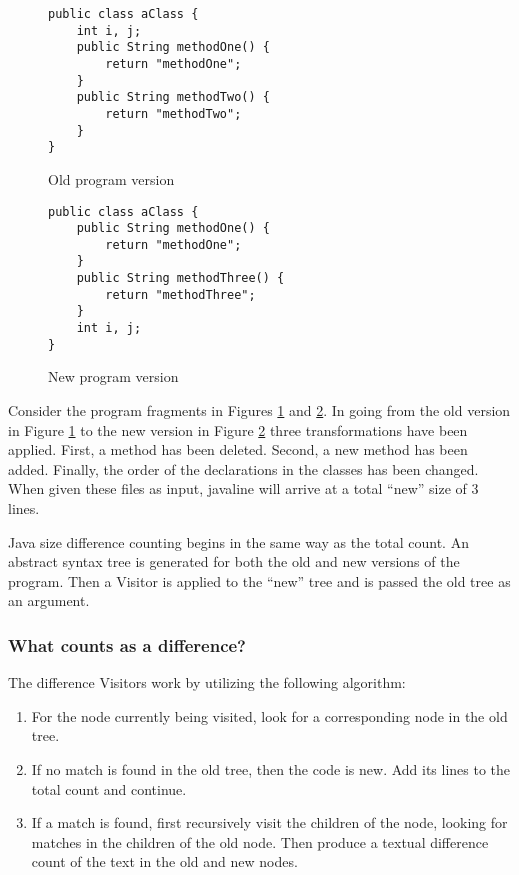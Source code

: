 \singlespace
\begin{figure}
  \centering 
  \begin{verbatim}
public class aClass {
    int i, j;
    public String methodOne() {
        return "methodOne";
    }
    public String methodTwo() {
        return "methodTwo";
    }
}
\end{verbatim}
  \caption{Old program version}
  \label{old-version}
\end{figure}

\begin{figure}
  \centering
  \begin{verbatim}
public class aClass {
    public String methodOne() {
        return "methodOne";
    }
    public String methodThree() {
        return "methodThree";
    }
    int i, j;
}
\end{verbatim}
  \caption{New program version}
  \label{new-version}
\end{figure}
\doublespace

Consider the program fragments in Figures \ref{old-version} and
\ref{new-version}.   
In going from the old version in Figure \ref{old-version} to the new
version in Figure \ref{new-version} three transformations have been applied.  First, a method
has been deleted.  Second, a new method has been added.  Finally, the
order of the declarations in the classes has been changed.  
When given these files as input, {\sc javaline} will
arrive at a total ``new'' size of 3 lines.


Java size difference counting begins in the same way as the total
count.  An abstract syntax tree is generated for both the old and new
versions of the program.  Then a Visitor is applied to the ``new''
tree and is passed the old tree as an argument.  

\subsubsection{What counts as a difference?}
\label{sect:whats-diff}
The difference Visitors work by utilizing the following
algorithm:

\begin{enumerate}
\item For the node currently being visited, look for a corresponding
  node in the old tree.  
\item If no match is found in the old tree, then the code is new.  Add 
  its lines to the total count and continue.
\item If a match is found, first recursively visit the children of the 
  node, looking for matches in the children of the old node.  Then
  produce a textual difference count of the text in the old and new
  nodes.
\end{enumerate}

